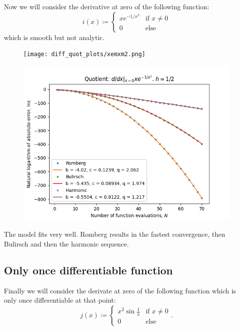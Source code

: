 Now we will consider the derivative at zero of the following function:
\[
i(x)\coloneqq \begin{cases}
xe^{-1/x^2} & \text{if } x \neq 0\\
0 & \text{else}
\end{cases}
\]
which is smooth but not analytic.
\begin{figure}[H]
\centering
\begin{minipage}{0.45\textwidth}
\centering
\texttt{[image: diff\_quot\_plots/xemxm2.png]}
\end{minipage}
\begin{minipage}{0.45\textwidth}
\centering
\includegraphics[scale=0.45]{diff_quot_plots/xemxm2_hp_trend.png}
\end{minipage}
\end{figure}

The model fits very well. Romberg results in the fastest convergence, then Bulirsch and then the harmonic sequence.

\subsection{Only once differentiable function}

Finally we will consider the derivate at zero of the following function which is only once differentiable at that point:
\[
j(x)\coloneqq \begin{cases}
x^2\sin\frac{1}{x} & \text{if } x \neq 0\\
0 & \text{else}
\end{cases}.
\]

